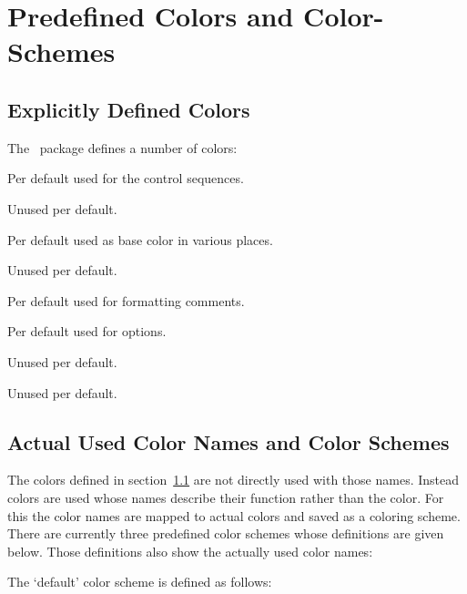 \documentclass[load-preamble]{cnltx-doc}
\newenvironment{colors}
  {%
    \def\colour##1{\item\code{\textcolor{##1}{##1}}}%
    \cnltxlist
  }
  {\endcnltxlist}
\begin{document}
\section{Predefined Colors and Color-Schemes}\label{sec:colors}
\subsection{Explicitly Defined Colors}\label{sec:colors:definitions}

The \cnltxbase\ package defines a number of colors:
\begin{colors}
  \colour{cnltxbrown}
    Per default used for the control sequences.
  \colour{cnltxblue}
    Unused per default.
  \colour{cnltxred}
    Per default used as base color in various places.
  \colour{cnltxgreen}
    Unused per default.
  \colour{cnltxgray}
    Per default used for formatting comments.
  \colour{cnltxyellow}
    Per default used for options.
  \colour{cnltxformalblue}
    Unused per default.
  \colour{cnltxformalred}
    Unused per default.
\end{colors}

\subsection{Actual Used Color Names and Color Schemes}

The colors defined in section~\ref{sec:colors:definitions} are not directly
used with those names.  Instead colors are used whose names describe their
function rather than the color.  For this the color names are mapped to actual
colors and saved as a coloring scheme.  There are currently three predefined
color schemes whose definitions are given below.  Those definitions also show
the actually used color names:

The `default' color scheme is defined as follows:
\begin{sourcecode}
\end{sourcecode}
\end{document}
